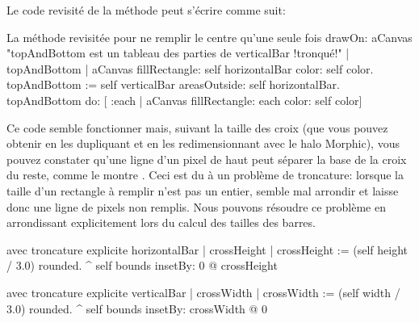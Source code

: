 \documentclass[a4paper,10pt,twoside]{book}
\begin{document}
Le code revisité de la méthode  peut s'écrire comme suit:

\begin{method}{La méthode  revisitée pour ne remplir le centre qu'une seule fois}
drawOn: aCanvas 
    "topAndBottom est un tableau des parties de verticalBar !tronqué!"
	| topAndBottom |
	aCanvas fillRectangle: self horizontalBar color: self color.
	topAndBottom := self verticalBar areasOutside: self horizontalBar. 
	topAndBottom do: [ :each | aCanvas fillRectangle: each color: self color]
\end{method}

Ce code semble fonctionner mais, suivant la taille des croix 
(que vous pouvez obtenir en les dupliquant et en les redimensionnant
avec le halo Morphic), vous pouvez constater qu'une ligne d'un pixel
de haut peut séparer la base de la croix du reste, comme le montre
.
Ceci est du à un problème de troncature: %
lorsque la taille d'un rectangle à remplir n'est pas un entier,
 semble mal arrondir et laisse donc une
ligne de pixels non remplis.
Nous pouvons résoudre ce problème en arrondissant explicitement
lors du calcul des tailles des barres.

\begin{method}{ avec troncature explicite}
horizontalBar
	| crossHeight |
	crossHeight := (self height / 3.0) rounded.
	^ self bounds insetBy: 0 @ crossHeight
\end{method}

\begin{method}{ avec troncature explicite}
verticalBar
	| crossWidth |
	crossWidth := (self width / 3.0) rounded.
	^ self bounds insetBy: crossWidth @ 0
\end{method}





\end{document}
